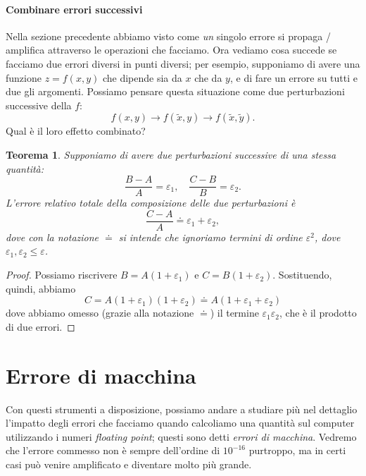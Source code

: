 \documentclass[a4paper]{report}
\newtheorem{theorem}{Teorema}[chapter]
\theoremstyle{definition}
\theoremstyle{remark}
\begin{document}
\paragraph{Combinare errori successivi} Nella sezione precedente abbiamo visto come \emph{un} singolo errore si propaga / amplifica attraverso le operazioni che facciamo. Ora vediamo cosa succede se facciamo due errori diversi in punti diversi; per esempio, supponiamo di avere una funzione $z = f(x,y)$ che dipende sia da $x$ che da $y$, e di fare un errore su tutti e due gli argomenti. Possiamo pensare questa situazione come due perturbazioni successive della $f$:
\[
    f(x,y) \to f(\tilde{x},y) \to f(\tilde{x},\tilde{y}).
\]
Qual è il loro effetto combinato? 
\begin{theorem} \label{thm: composizione di due errori}
    Supponiamo di avere due perturbazioni successive di una stessa quantità:
    \[
    \frac{B-A}{A} = \varepsilon_1, \quad \frac{C-B}{B} = \varepsilon_2.
    \]
    L'errore relativo totale della composizione delle due perturbazioni è
    \[
    \frac{C-A}{A} \doteq \varepsilon_1 + \varepsilon_2,
    \]
    dove con la notazione $\doteq$ si intende che ignoriamo termini di ordine $\varepsilon^2$, dove $\varepsilon_1,\varepsilon_2 \leq \varepsilon$.
\end{theorem}
\begin{proof}
    Possiamo riscrivere $B = A(1+\varepsilon_1)$ e $C = B(1+\varepsilon_2)$. Sostituendo, quindi, abbiamo
    \[
    C = A(1+\varepsilon_1)(1+\varepsilon_2) \doteq A(1+\varepsilon_1+\varepsilon_2)
    \]
    dove abbiamo omesso (grazie alla notazione $\doteq$) il termine $\varepsilon_1\varepsilon_2$, che è il prodotto di due errori.
\end{proof}

\section{Errore di macchina}
Con questi strumenti a disposizione, possiamo andare a studiare più nel dettaglio l'impatto degli errori che facciamo quando calcoliamo una quantità sul computer utilizzando i numeri \emph{floating point}; questi sono detti \emph{errori di macchina}. Vedremo che l'errore commesso non è sempre dell'ordine di $10^{-16}$ purtroppo, ma in certi casi può venire amplificato e diventare molto più grande.
\end{document}
